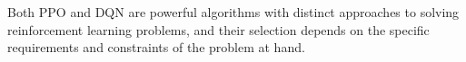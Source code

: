 \documentclass[conference]{IEEEtran}
\begin{document}





 Both PPO and DQN are powerful algorithms with distinct approaches to solving reinforcement learning problems, and their selection depends on the specific requirements and constraints of the problem at hand.

\end{document}
